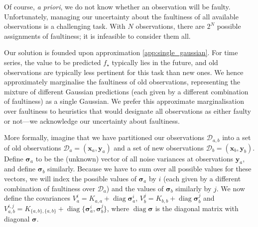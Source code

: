 \documentclass{article} %
\newcommand{\deq}{=}
\newcommand{\cm}[1]{\ensuremath{\mathcal{#1}}}
\newcommand{\bm}[1]{\ensuremath{\mathbf{#1}}}
\newcommand{\data}{\ensuremath{\cm{D}}}
\newcommand{\vect}[1]{\bm{#1}}
\newcommand{\vy}{\vect{y}}
\newcommand{\vx}{\vect{x}}
\newcommand{\vs}{\vect{\sigma}}
\newcommand{\st}{_{\star}}
\DeclareMathOperator{\diag}{diag}
\begin{document}
Of course, {\it a priori}, we do not know whether an
observation will be faulty.  Unfortunately, managing our uncertainty
about the faultiness of all available observations is a
challenging task. With $N$ observations, there are $2^N$
possible assignments of faultiness; it is infeasible to consider them all.

Our solution is founded upon approximation \ref{app:single_gaussian}. 
For time series, the value to be predicted $f\st$
typically lies in the future, and old observations are
typically less pertinent for this task than new ones. We hence approximately marginalise the faultiness of old observations, representing the mixture of different Gaussian predictions (each given by a different combination of faultiness) as a single Gaussian.
We prefer this approximate marginalisation over
faultiness to heuristics that would designate all
observations as either faulty or not---we acknowledge our
uncertainty about faultiness.

More formally, imagine that we have partitioned our observations
$\data_{a,b}$ into a set of old observations
$\data_a\deq(\vx_a,\vy_a)$ and a set of new observations $\data_b
\deq (\vx_b,\vy_b)$. Define $\vs_{a}$ to be the (unknown) vector of
all noise variances at observations $\vy_{a}$, and define $\vs_{b}$
similarly. Because we have to sum over all possible values for these
vectors, we will index the possible values of
$\vs_{a}$ by $i$ (each given by a different combination of
faultiness over $\data_a$) and the values of $\vs_{b}$ similarly by
$j$. We now define the covariances
 $V_a^i  \deq K_{a,a} + \diag \vs_{a}^i$,
 $V_b^j  \deq K_{b,b} + \diag \vs_{b}^j$ and
 $V_{a,b}^{i,j} \deq K_{\{a,b\},\{a,b\}} + \diag \{\vs_{a}^i,\vs_{b}^j\}$,
where $\diag \vs$ is the diagonal matrix with diagonal $\vs$. 
\end{document}

